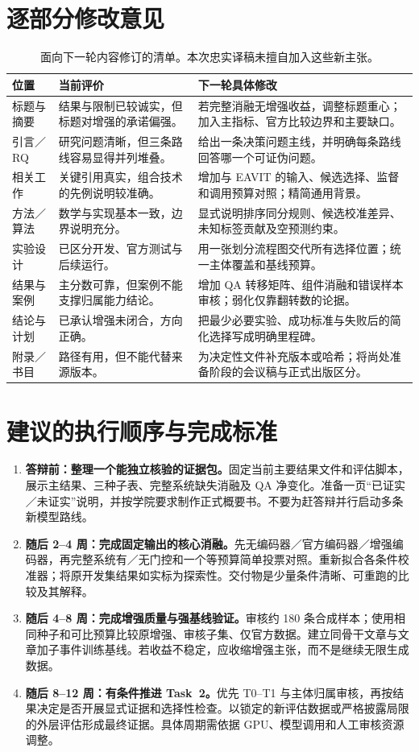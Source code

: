 \documentclass[12pt,a4paper]{article}
\begin{document}
\section{逐部分修改意见}
\begin{table}[H]
\centering\small
\caption{面向下一轮内容修订的清单。本次忠实译稿未擅自加入这些新主张。}
\begin{tabularx}{\textwidth}{@{}P{2.3cm}YY@{}}
\toprule
位置 & 当前评价 & 下一轮具体修改 \\
\midrule
标题与摘要 & 结果与限制已较诚实，但标题对增强的承诺偏强。 & 若完整消融无增强收益，调整标题重心；加入主指标、官方比较边界和主要缺口。 \\
引言／RQ & 研究问题清晰，但三条路线容易显得并列堆叠。 & 给出一条决策问题主线，并明确每条路线回答哪一个可证伪问题。 \\
相关工作 & 关键引用真实，组合技术的先例说明较准确。 & 增加与 EAVIT 的输入、候选选择、监督和调用预算对照；精简通用背景。 \\
方法／算法 & 数学与实现基本一致，边界说明充分。 & 显式说明排序同分规则、候选校准差异、未知标签贡献及空预测约束。 \\
实验设计 & 已区分开发、官方测试与后续运行。 & 用一张划分流程图交代所有选择位置；统一主体覆盖和基线预算。 \\
结果与案例 & 主分数可靠，但案例不能支撑归属能力结论。 & 增加 QA 转移矩阵、组件消融和错误样本审核；弱化仅靠翻转数的论据。 \\
结论与计划 & 已承认增强未闭合，方向正确。 & 把最少必要实验、成功标准与失败后的简化选择写成明确里程碑。 \\
附录／书目 & 路径有用，但不能代替来源版本。 & 为决定性文件补充版本或哈希；将尚处准备阶段的会议稿与正式出版区分。 \\
\bottomrule
\end{tabularx}
\end{table}

\section{建议的执行顺序与完成标准}
\begin{enumerate}
\item \textbf{答辩前：整理一个能独立核验的证据包。}固定当前主要结果文件和评估脚本，展示主结果、三种子表、完整系统缺失消融及 QA 净变化。准备一页“已证实／未证实”说明，并按学院要求制作正式概要书。不要为赶答辩并行启动多条新模型路线。
\item \textbf{随后 2--4 周：完成固定输出的核心消融。}先无编码器／官方编码器／增强编码器，再完整系统有／无门控和一个等预算简单投票对照。重新拟合各条件校准器；将原开发集结果如实标为探索性。交付物是少量条件清晰、可重跑的比较及其解释。
\item \textbf{随后 4--8 周：完成增强质量与强基线验证。}审核约 180 条合成样本；使用相同种子和可比预算比较原增强、审核子集、仅官方数据。建立同骨干文章与文章加子事件训练基线。若收益不稳定，应收缩增强主张，而不是继续无限生成数据。
\item \textbf{随后 8--12 周：有条件推进 Task~2。}优先 T0--T1 与主体归属审核，再按结果决定是否开展显式证据和选择性检查。以锁定的新评估数据或严格披露局限的外层评估形成最终证据。具体周期需依据 GPU、模型调用和人工审核资源调整。
\end{enumerate}
\end{document}
